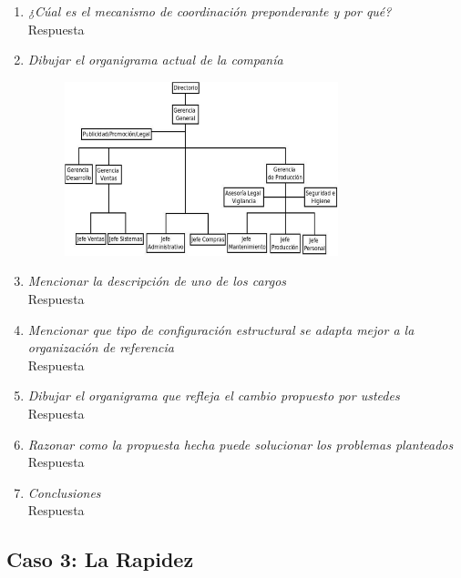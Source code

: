 \documentclass[a4paper,10pt]{article}
\begin{document}
\begin{enumerate}
			\item \textit{¿Cúal es el mecanismo de coordinación preponderante y por qué?}\\
			Respuesta
						
			\item \textit{Dibujar el organigrama actual de la companía}\\
			\begin{figure}[!h]
			\includegraphics[width=0.75\textwidth]{imagenes/orgaLosGringos.png}
			\end{figure}			
			\item \textit{Mencionar la descripción de uno de los cargos}\\
			Respuesta
						
			\item \textit{Mencionar que tipo de configuración estructural se adapta mejor a la organización de referencia}\\
			Respuesta
						
			\item \textit{Dibujar el organigrama que refleja el cambio propuesto por ustedes}\\
			Respuesta
						
			\item \textit{Razonar como la propuesta hecha puede solucionar los problemas planteados}\\
			Respuesta
			
			\item \textit{Conclusiones}\\
			Respuesta
			
			\end{enumerate}
		
	\subsection{Caso 3: La Rapidez}
\end{document}

